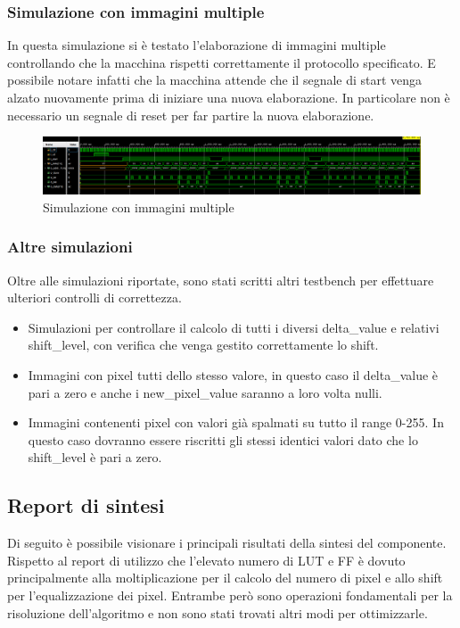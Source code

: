 \documentclass{article}
\begin{document}
\subsubsection{Simulazione con immagini multiple}
In questa simulazione si è testato l'elaborazione di immagini multiple controllando che la macchina rispetti correttamente il protocollo specificato. E possibile notare infatti che la macchina attende che il segnale di start venga alzato nuovamente prima di iniziare una nuova elaborazione. In particolare non è necessario un segnale di reset per far partire la nuova elaborazione.
\begin{figure}[h]
    \includegraphics[width=\textwidth]{test-multiple-images.png}
    \centering
    \caption{Simulazione con immagini multiple}
\end{figure}

\subsubsection{Altre simulazioni}
Oltre alle simulazioni riportate, sono stati scritti altri testbench per effettuare ulteriori controlli di correttezza.
\begin{itemize}
    \item Simulazioni per controllare il calcolo di tutti i diversi delta\_value e relativi shift\_level, con verifica che venga gestito correttamente lo shift.
    \item Immagini con pixel tutti dello stesso valore, in questo caso il delta\_value è pari a zero e anche i new\_pixel\_value saranno a loro volta nulli.
    \item Immagini contenenti pixel con valori già spalmati su tutto il range 0-255. In questo caso dovranno essere riscritti gli stessi identici valori dato che lo shift\_level è pari a zero.
\end{itemize}

\pagebreak

\subsection{Report di sintesi}
Di seguito è possibile visionare i principali risultati della sintesi del componente. Rispetto al report di utilizzo che l'elevato numero di LUT e FF è dovuto principalmente alla moltiplicazione per il calcolo del numero di pixel e allo shift per l'equalizzazione dei pixel. Entrambe però sono operazioni fondamentali per la risoluzione dell'algoritmo e non sono stati trovati altri modi per ottimizzarle.
\end{document}
